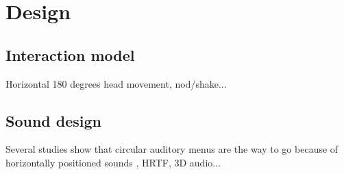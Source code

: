 \chapter{Design}

\section{Interaction model}
Horizontal 180 degrees head movement, nod/shake...


\section{Sound design}
Several studies show that circular auditory menus are the way to go because of horizontally positioned sounds , HRTF, 3D audio...



